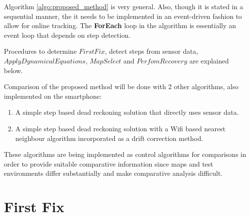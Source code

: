 Algorithm \ref{algo:proposed_method} is very general. Also, though it is 
stated in a sequential manner, the it needs to 
be implemented in an event-driven fashion to allow for online tracking. 
The \textbf{ForEach} loop in the algorithm is essentially an event loop 
that depends on step detection.

Procedures to determine $FirstFix$, detect steps from sensor data, 
$ApplyDynamicalEquations$, $MapSelect$ and $PerfomRecovery$ are explained
below.


Comparison of the proposed method will be done with 2 other algorithms, also
implemented on the smartphone: 

\begin{enumerate}
\item A simple step based dead reckoning solution that directly uses sensor data.
\item A simple step based dead reckoning solution with a Wifi based nearest neighbour algorithm incorporated as a 
    drift correction method.    
\end{enumerate}

These algorithms are being implemented as control algorithms for comparisons
in order to provide suitable comparative information since maps and test 
environments differ substantially and make comparative analysis difficult.

\section{First Fix\label{sec:first_fix}}

